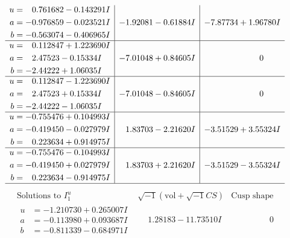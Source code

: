 \documentclass[1p]{elsarticle_modified}
\theoremstyle{definition}
\newcommand{\I}{\sqrt{-1}}
\begin{document}
$$\begin{array}{c|c|c}
\begin{aligned}
u &= \phantom{-}0.761682 - 0.143291 I \\
a &= -0.976859 - 0.023521 I \\
b &= -0.563074 - 0.406965 I\end{aligned}
 & -1.92081 - 0.61884 I & -7.87734 + 1.96780 I \\ \hline\begin{aligned}
u &= \phantom{-}0.112847 + 1.223690 I \\
a &= \phantom{-}2.47523 - 0.15334 I \\
b &= -2.44222 + 1.06035 I\end{aligned}
 & -7.01048 + 0.84605 I & \phantom{-0.000000 } 0 \\ \hline\begin{aligned}
u &= \phantom{-}0.112847 - 1.223690 I \\
a &= \phantom{-}2.47523 + 0.15334 I \\
b &= -2.44222 - 1.06035 I\end{aligned}
 & -7.01048 - 0.84605 I & \phantom{-0.000000 } 0 \\ \hline\begin{aligned}
u &= -0.755476 + 0.104993 I \\
a &= -0.419450 - 0.027979 I \\
b &= \phantom{-}0.223634 + 0.914975 I\end{aligned}
 & \phantom{-}1.83703 - 2.21620 I & -3.51529 + 3.55324 I \\ \hline\begin{aligned}
u &= -0.755476 - 0.104993 I \\
a &= -0.419450 + 0.027979 I \\
b &= \phantom{-}0.223634 - 0.914975 I\end{aligned}
 & \phantom{-}1.83703 + 2.21620 I & -3.51529 - 3.55324 I\\
 \hline 
 \end{array}$$\newpage$$\begin{array}{c|c|c}  
\text{Solutions to }I^u_{1}& \I (\text{vol} + \sqrt{-1}CS) & \text{Cusp shape}\\
 \hline 
\begin{aligned}
u &= -1.210730 + 0.265007 I \\
a &= -0.113980 + 0.093687 I \\
b &= -0.811339 - 0.684971 I\end{aligned}
 & \phantom{-}1.28183 - 11.73510 I & \phantom{-0.000000 } 0 \\ \hline\begin{aligned}

\end{aligned}
\end{array}$$
\end{document}
